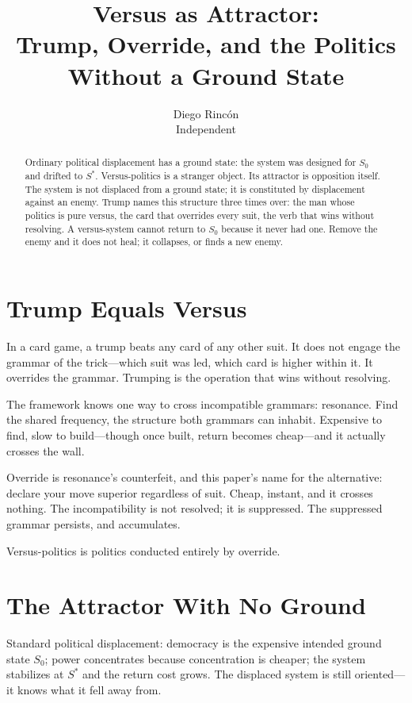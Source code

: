 \documentclass[12pt]{article}
\title{Versus as Attractor:\\
Trump, Override, and the Politics Without a Ground State}
\author{Diego Rincón\\
\small Independent}
\date{}
\begin{document}
\maketitle

\begin{abstract}
Ordinary political displacement has a ground state: the system was designed for $S_0$ and drifted to $S^*$. Versus-politics is a stranger object. Its attractor is opposition itself. The system is not displaced from a ground state; it is constituted by displacement against an enemy. Trump names this structure three times over: the man whose politics is pure versus, the card that overrides every suit, the verb that wins without resolving. A versus-system cannot return to $S_0$ because it never had one. Remove the enemy and it does not heal; it collapses, or finds a new enemy.
\end{abstract}

\section{Trump Equals Versus}

In a card game, a trump beats any card of any other suit. It does not engage the grammar of the trick---which suit was led, which card is higher within it. It overrides the grammar. Trumping is the operation that wins without resolving.

The framework knows one way to cross incompatible grammars: resonance. Find the shared frequency, the structure both grammars can inhabit. Expensive to find, slow to build---though once built, return becomes cheap---and it actually crosses the wall.

Override is resonance's counterfeit, and this paper's name for the alternative: declare your move superior regardless of suit. Cheap, instant, and it crosses nothing. The incompatibility is not resolved; it is suppressed. The suppressed grammar persists, and accumulates.

Versus-politics is politics conducted entirely by override.

\section{The Attractor With No Ground}

Standard political displacement: democracy is the expensive intended ground state $S_0$; power concentrates because concentration is cheaper; the system stabilizes at $S^*$ and the return cost grows. The displaced system is still oriented---it knows what it fell away from.
\end{document}
